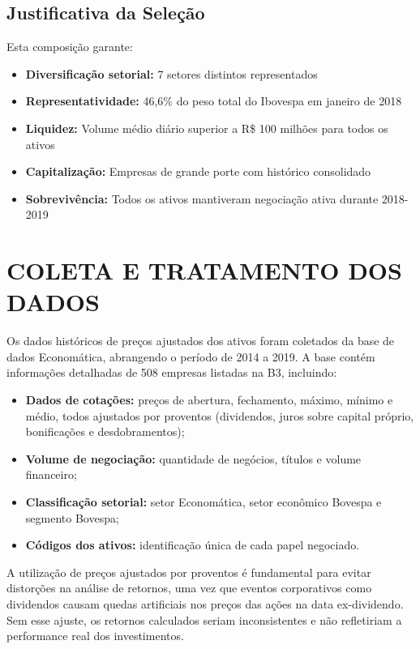 \subsection{Justificativa da Seleção}

Esta composição garante:
\begin{itemize}
    \item \textbf{Diversificação setorial:} 7 setores distintos representados
    \item \textbf{Representatividade:} 46,6\% do peso total do Ibovespa em janeiro de 2018
    \item \textbf{Liquidez:} Volume médio diário superior a R\$ 100 milhões para todos os ativos
    \item \textbf{Capitalização:} Empresas de grande porte com histórico consolidado
    \item \textbf{Sobrevivência:} Todos os ativos mantiveram negociação ativa durante 2018-2019
\end{itemize}

\section{COLETA E TRATAMENTO DOS DADOS}

Os dados históricos de preços ajustados dos ativos foram coletados da base de dados Economática, abrangendo o período de 2014 a 2019. A base contém informações detalhadas de 508 empresas listadas na B3, incluindo:

\begin{itemize}
    \item \textbf{Dados de cotações:} preços de abertura, fechamento, máximo, mínimo e médio, todos ajustados por proventos (dividendos, juros sobre capital próprio, bonificações e desdobramentos);
    \item \textbf{Volume de negociação:} quantidade de negócios, títulos e volume financeiro;
    \item \textbf{Classificação setorial:} setor Economática, setor econômico Bovespa e segmento Bovespa;
    \item \textbf{Códigos dos ativos:} identificação única de cada papel negociado.
\end{itemize}

A utilização de preços ajustados por proventos é fundamental para evitar distorções na análise de retornos, uma vez que eventos corporativos como dividendos causam quedas artificiais nos preços das ações na data ex-dividendo. Sem esse ajuste, os retornos calculados seriam inconsistentes e não refletiriam a performance real dos investimentos.

